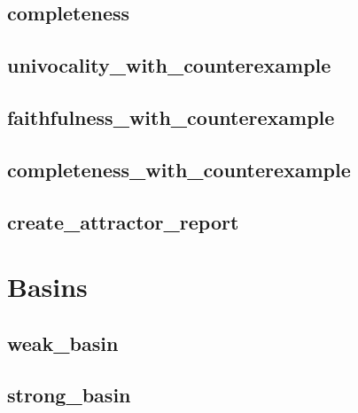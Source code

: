 \documentclass[letterpaper,10pt,english]{sphinxmanual}
\begin{document}
\subsection{completeness}
\label{\detokenize{Attractors:id6}}\label{\detokenize{Attractors:completeness}}

\subsection{univocality\_with\_counterexample}
\label{\detokenize{Attractors:id7}}\label{\detokenize{Attractors:univocality-with-counterexample}}

\subsection{faithfulness\_with\_counterexample}
\label{\detokenize{Attractors:faithfulness-with-counterexample}}\label{\detokenize{Attractors:id8}}

\subsection{completeness\_with\_counterexample}
\label{\detokenize{Attractors:completeness-with-counterexample}}\label{\detokenize{Attractors:id9}}

\subsection{create\_attractor\_report}
\label{\detokenize{Attractors:id10}}\label{\detokenize{Attractors:create-attractor-report}}

\section{Basins}
\label{\detokenize{Basins:basins}}\label{\detokenize{Basins::doc}}\label{\detokenize{Basins:id1}}

\subsection{weak\_basin}
\label{\detokenize{Basins:weak-basins}}\label{\detokenize{Basins:weak-basin}}

\subsection{strong\_basin}
\label{\detokenize{Basins:id2}}\label{\detokenize{Basins:strong-basin}}
\end{document}
